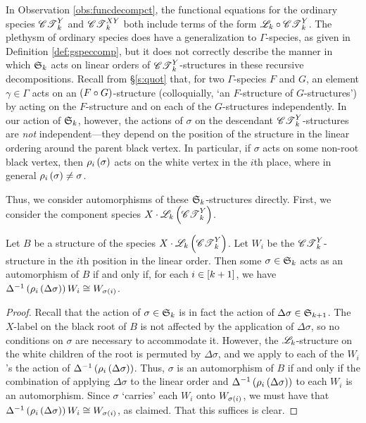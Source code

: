 \documentclass[distribution,draft]{brandiss} %
\numberwithin{section}{chapter}
\numberwithin{figure}{chapter}
\begin{document}
In Observation \ref{obs:funcdecompct}, the functional equations for the ordinary species $\mathscr{CT}_{k}^{Y}$ and $\mathscr{CT}_{k}^{XY}$ both include terms of the form $\mathscr{L}_{k} \circ \mathscr{CT}_{k}^{Y}$.
The plethysm of ordinary species does have a generalization to $\Gamma$-species, as given in Definition \ref{def:gspeccomp}, but it does not correctly describe the manner in which $ \mathfrak{S}_{k} $ acts on linear orders of $\mathscr{CT}_{k}^{Y}$-structures in these recursive decompositions.
Recall from \S \ref{s:quot} that, for two $\Gamma$-species $F$ and $G$, an element $\gamma \in \Gamma$ acts on an $\left( {F \circ G} \right)$-structure (colloquially, `an $F$-structure of $G$-structures') by acting on the $F$-structure and on each of the $G$-structures independently.
In our action of $ \mathfrak{S}_{k} $, however, the actions of $\sigma$ on the descendant $\mathscr{CT}_{k}^{Y}$-structures are \emph{not} independent---they depend on the position of the structure in the linear ordering around the parent black vertex.
In particular, if $\sigma$ acts on some non-root black vertex, then $\rho_{i} \left( {\sigma} \right)$ acts on the white vertex in the $i$th place, where in general $\rho_{i} \left( {\sigma} \right) \neq \sigma$.

Thus, we consider automorphisms of these $ \mathfrak{S}_{k} $-structures directly.
First, we consider the component species $X \cdot \mathscr{L}_{k} \left( {\mathscr{CT}_{k}^{Y}} \right)$.
\begin{lemma}
  \label{lem:ctyinvar}
  Let $B$ be a structure of the species $X \cdot \mathscr{L}_{k} \left( {\mathscr{CT}_{k}^{Y}} \right)$.
  Let $W_{i}$ be the $\mathscr{CT}_{k}^{Y}$-structure in the $i$th position in the linear order.
  Then some $\sigma \in  \mathfrak{S}_{k} $ acts as an automorphism of $B$ if and only if, for each $i \in \left[ {k+1} \right]$, we have $\Delta^{-1} \left( {\rho_{i} \left( {\Delta \sigma} \right)} \right) W_{i} \cong W_{\sigma \left( {i} \right)}$.
\end{lemma}

\begin{proof}
  Recall that the action of $\sigma \in  \mathfrak{S}_{k} $ is in fact the action of $\Delta \sigma \in  \mathfrak{S}_{k+1} $.
  The $X$-label on the black root of $B$ is not affected by the application of $\Delta \sigma$, so no conditions on $\sigma$ are necessary to accommodate it.
  However, the $\mathscr{L}_{k}$-structure on the white children of the root is permuted by $\Delta \sigma$, and we apply to each of the $W_{i}$'s the action of $\Delta^{-1} \left( {\rho_{i} \left( {\Delta \sigma} \right)} \right)$.
  Thus, $\sigma$ is an automorphism of $B$ if and only if the combination of applying $\Delta \sigma$ to the linear order and $\Delta^{-1} \left( {\rho_{i} \left( {\Delta \sigma} \right)} \right)$ to each $W_{i}$ is an automorphism.
  Since $\sigma$ `carries' each $W_{i}$ onto $W_{\sigma \left( {i} \right)}$, we must have that $\Delta^{-1} \left( {\rho_{i} \left( {\Delta \sigma} \right)} \right) W_{i} \cong W_{\sigma \left( {i} \right)}$, as claimed.
  That this suffices is clear.
\end{proof}
\end{document}
